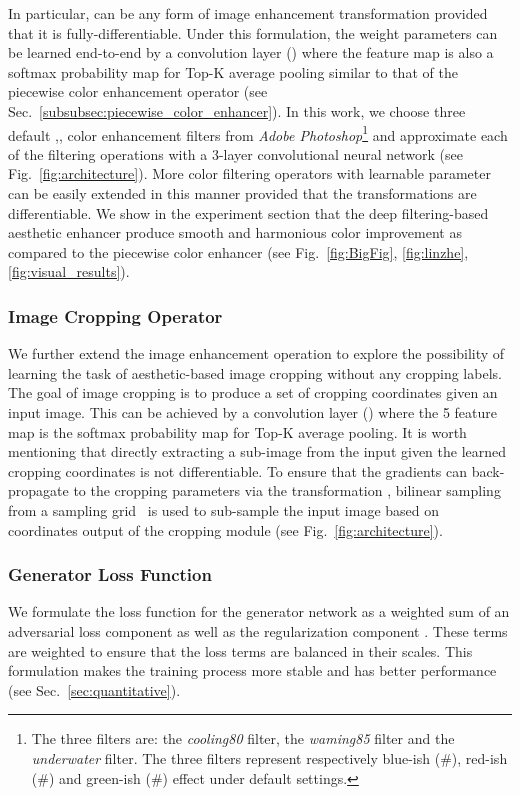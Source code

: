 \documentclass[sigconf]{acmart}
\begin{document}
In particular,  can be any form of image enhancement transformation provided that it is fully-differentiable. Under this formulation, the weight parameters  can be learned end-to-end by a convolution layer () where the  feature map is also a  softmax probability map for Top-K average pooling similar to that of the piecewise color enhancement operator (see Sec.~\ref{subsubsec:piecewise_color_enhancer}). In this work, we choose three default 
,, color enhancement filters from \textit{Adobe Photoshop}\footnote{The three filters are: the \textit{cooling80} filter, the \textit{waming85} filter and the \textit{underwater} filter. The three filters represent respectively blue-ish (\#), red-ish (\#) and green-ish (\#) effect under default settings.} and approximate each of the filtering operations with a 3-layer convolutional neural network (see Fig.~\ref{fig:architecture}). 
More color filtering operators  with learnable parameter  can be easily extended in this manner provided that the transformations  are differentiable. We show in the experiment section that the deep filtering-based aesthetic enhancer produce smooth and harmonious color improvement as compared to the piecewise color enhancer (see Fig.~\ref{fig:BigFig}, \ref{fig:linzhe}, \ref{fig:visual_results}).


\subsubsection{Image Cropping Operator}
We further extend the image enhancement operation to explore the possibility of learning the task of aesthetic-based image cropping without any cropping labels. The goal of image cropping is to produce a set of cropping coordinates  given an input image. This can be achieved by a convolution layer () where the 5 feature map is the softmax probability map for Top-K average pooling. It is worth mentioning that directly extracting a sub-image from the input given the learned cropping coordinates   is not differentiable. To ensure that the gradients can back-propagate to the cropping parameters via the transformation , bilinear sampling from a sampling grid~\cite{jaderberg2015spatial} is used to sub-sample the input image based on coordinates output  of the cropping module (see Fig.~\ref{fig:architecture}). 









\subsubsection{Generator Loss Function }
\label{sec:generator_loss}
We formulate the loss function for the generator network as a weighted sum of an adversarial loss component  as well as the regularization component . These terms are weighted to ensure that the loss terms are balanced in their scales. This formulation makes the training process more stable and has better performance (see Sec.~\ref{sec:quantitative}).
\end{document}
